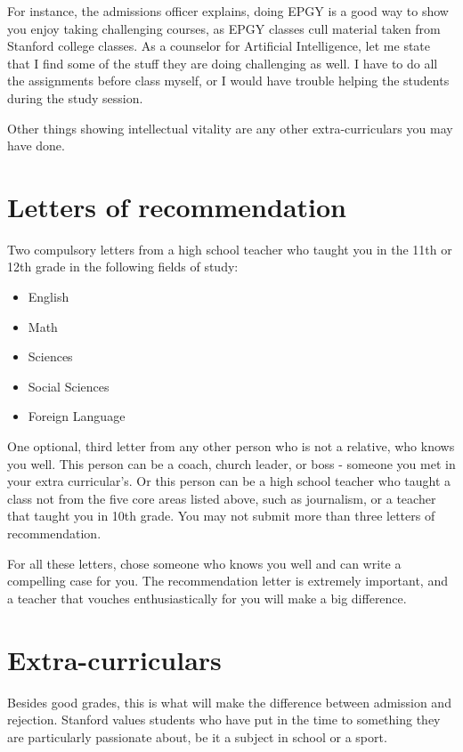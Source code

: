 \documentclass[12pt]{article}
\begin{document}
For instance, the admissions officer explains, doing EPGY is a 
good way to show you enjoy taking challenging courses,
as EPGY classes cull material taken from Stanford college classes.
As a counselor for Artificial Intelligence, let me state
that I find some of the stuff they are doing challenging as well.
I have to do all the assignments before class myself, or I would have 
trouble helping the students during the study session.

Other things showing intellectual vitality are any other
extra-curriculars you may have done. 


\section{Letters of recommendation}

Two compulsory letters from a high school teacher who taught you
in the 11th or 12th grade in the following fields of study:
\begin{itemize}
  \item English
  \item Math
  \item Sciences
  \item Social Sciences
  \item Foreign Language
\end{itemize}

One optional, third letter from any other person who is not a relative,
who knows you well.
This person can be a coach, church leader, or boss - someone you met in your
extra curricular's. Or this person can be a high school
teacher who taught a class not from the five core areas listed above,
such as journalism, or a teacher that taught you in 10th grade.
You may not submit more than three letters of recommendation.  

For all these letters, chose someone who knows you well and can write
a compelling case for you. The recommendation letter is extremely important,
and a teacher that vouches enthusiastically for you will make a big difference. 


\section{Extra-curriculars}

Besides good grades, this is what will make the difference between admission
and rejection. 
Stanford values students who have put in the time to something they are
particularly passionate about, be it a subject in school or a sport.
\end{document}
